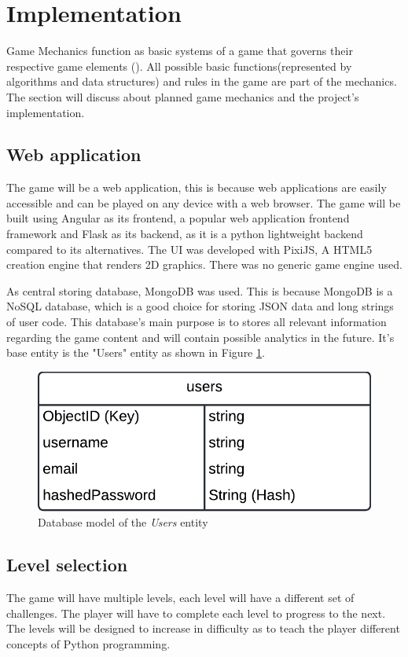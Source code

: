 \section{Implementation}
Game Mechanics function as basic systems of a game that governs their respective game elements (\cite{adams2012game}). All possible basic functions(represented by algorithms and data structures) and rules in the game are part of the mechanics. The section will discuss about planned game mechanics and the project's implementation.

\subsection{Web application}
The game will be a web application, this is because web applications are easily accessible and can be played on any device with a web browser. The game will be built using Angular as its frontend, a popular web application frontend framework and Flask as its backend, as it is a python lightweight backend compared to its alternatives. The UI was developed with PixiJS, A HTML5 creation engine that renders 2D graphics. There was no generic game engine used.

As central storing database, MongoDB was used. This is because MongoDB is a NoSQL database, which is a good choice for storing JSON data and long strings of user code. This database's main purpose is to stores all relevant information regarding the game content and will contain possible analytics in the future. It's base entity is the "Users" entity as shown in Figure \ref{fig:users}.
\begin{figure}[h]
    \centering
    \includegraphics[width=0.5\linewidth]{images/user_object.png}
    \caption{Database model of the \textit{Users} entity}    
    \label{fig:users}
\end{figure}

\subsection{Level selection}
The game will have multiple levels, each level will have a different set of challenges. The player will have to complete each level to progress to the next. The levels will be designed to increase in difficulty as to teach the player different concepts of Python programming.

